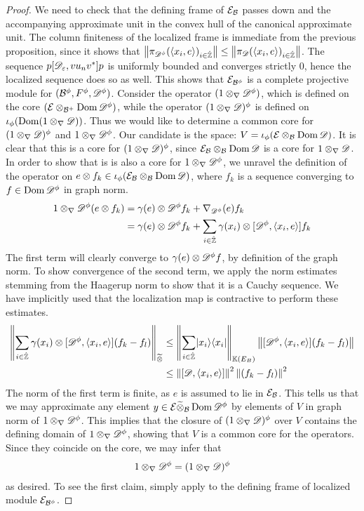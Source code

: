 \begin{proof}
	We need to check that the defining frame of $\mathcal{E}_{\mathcal{B}}$ passes down and the accompanying approximate unit in the convex hull of the canonical approximate unit. The column finiteness of the localized frame is immediate from the previous proposition, since it shows that $\norm{\pi_{\D^\phi}(\ip{x_i}{e})_{i\in \Zred}}\leq \norm{\pi_\D(\ip{x_i}{e})_{i\in \Zred}}$. The sequence $p[\mathscr{D}_\varepsilon,vu_nv^*]p$ is uniformly bounded and converges strictly 0, hence the localized sequence does so as well. This shows that $\E_{\B^\phi}$ is a complete projective module for $(\B^\phi,F^\phi,\D^\phi)$. 
	Consider the operator $(1\tens_\nabla \D^\phi)$, which is defined on the core $(\E\tens_{\B^+} \dom \D^\phi)$, while the operator $(1\tens_\nabla \D)^\phi$ is defined on $\iota_\phi(\dom (1\tens_\nabla \D))$.
	Thus we would like to determine a common core for $(1\tens_\nabla \D)^\phi$ and $1\tens_\nabla \D^\phi$. Our candidate is the space: $V=\iota_\phi(\E\tens_\B \dom \D)$. It is clear that this is a core for $(1\tens_\nabla \D)^\phi$, since $\mathcal{E}_{\mathcal{B}}\otimes_{\mathcal{B}} \operatorname{Dom} \mathscr{D}$ is a core for $1\otimes_\nabla \mathscr{D}$. In order to show that is is also a core for $1\tens_\nabla \D^\phi$, we unravel the definition of the operator on $e\tens f_k \in \iota_{\phi}(\E_\B\tens_\B \dom \D)$, where $f_k$ is a sequence converging to $f\in \dom \D^\phi$ in graph norm. 
	\begin{align*}
		1\tens_\nabla \D^\phi (e\tens f_k)&=\gamma(e)\tens \D^\phi f_k+\nabla_{\D^\phi}(e)f_k \\
		&=\gamma(e)\tens \D^\phi f_k+\sum_{i\in \Zred}  \gamma(x_i) \tens [\D^\phi,\ip{x_i}{e}]f_k 
	\end{align*}
	The first term will clearly converge to $\gamma(e) \tens \D^\phi f$, by definition of the graph norm. To show convergence of the second term, we apply the norm estimates stemming from the Haagerup norm to show that it is a Cauchy sequence. We have implicitly used that the localization map is contractive to perform these estimates. 
	\begin{align*}
		\norm{\sum_{i\in \Zred}  \gamma(x_i) \tens [\D^\phi,\ip{x_i}{e}](f_k-f_l)}_{\optens}&\leq \norm{\sum_{i\in \Zred} \ket{x_i}\bra{x_i}}_{\K(E_B)}\norm{[\D^\phi,\ip{x_i}{e}](f_k-f_l)} \\
		&\leq \norm{[\D,\ip{x_i}{e}]}^2\norm{(f_k-f_l)}^2
	\end{align*}
	The norm of the first term is finite, as $e$ is assumed to lie in $\mathcal{E}_{\mathcal{B}}$. 
	This tells us that we may approximate any element $y\in \E\optens_\B \dom \D^\phi$ by elements of $V$ in graph norm of $1\tens_\nabla \D^\phi$. This implies that the closure of $(1\tens_\nabla \D)^\phi$ over $V$ contains the defining domain of $1\tens_\nabla \D^\phi$, showing that $V$ is a common core for the  operators. Since they coincide on the core, we may infer that 
	\begin{align*}
		1\tens_\nabla \D^\phi=(1\tens_\nabla \D)^\phi
	\end{align*}
	as desired.  To see the first claim, simply apply  to the defining frame of localized module $\E_{\B^\phi}$. 
\end{proof}
